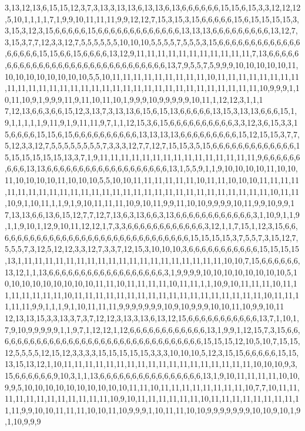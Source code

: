 3,13,12,13,6,15,15,12,3,7,3,13,3,13,13,6,13,13,6,13,6,6,6,6,6,6,15,15,6,15,3,3,12,12,12,5,10,1,1,1,1,7,1,9,9,10,11,11,11,9,9,12,12,7,15,3,15,3,15,6,6,6,6,6,15,6,15,15,15,15,3,3,15,3,12,3,15,6,6,6,6,6,15,6,6,6,6,6,6,6,6,6,6,6,6,6,13,13,13,6,6,6,6,6,6,6,6,6,13,12,7,3,15,3,7,7,12,3,3,12,7,5,5,5,5,5,5,10,10,10,5,5,5,5,7,5,5,5,3,15,6,6,6,6,6,6,6,6,6,6,6,6,6,6,6,6,6,6,15,15,6,6,15,6,6,6,6,13,12,9,11,11,11,11,11,11,11,11,11,11,11,7,13,6,6,6,6,6,6,6,6,6,6,6,6,6,6,6,6,6,6,6,6,6,6,6,6,6,6,6,6,6,6,13,7,9,5,5,7,5,9,9,9,10,10,10,10,10,11,10,10,10,10,10,10,10,10,5,5,10,11,11,11,11,11,11,11,11,11,10,11,11,11,11,11,11,11,11,11,11,11,11,11,11,11,11,11,11,11,11,11,11,11,11,11,11,11,11,11,11,11,11,10,9,9,9,1,10,11,10,9,1,9,9,9,11,9,11,10,11,10,1,9,9,9,10,9,9,9,9,9,10,11,1,12,12,3,1,1,1
7,12,13,6,6,3,6,6,15,12,3,13,7,3,13,13,6,15,6,15,13,6,6,6,6,6,13,15,3,13,13,6,6,6,15,1,9,1,1,1,1,1,9,11,9,1,9,11,11,9,7,1,1,12,15,3,6,15,6,6,6,6,6,6,6,6,6,6,3,3,12,3,6,15,3,3,15,6,6,6,6,15,15,6,15,6,6,6,6,6,6,6,6,6,6,13,13,13,13,6,6,6,6,6,6,6,6,6,15,12,15,15,3,7,7,5,12,3,3,12,7,5,5,5,5,5,5,5,5,7,3,3,3,12,7,7,12,7,15,15,3,5,15,6,6,6,6,6,6,6,6,6,6,6,6,6,15,15,15,15,15,15,13,3,7,1,9,11,11,11,11,11,11,11,11,11,11,11,11,11,11,11,9,6,6,6,6,6,6,6,6,6,13,13,6,6,6,6,6,6,6,6,6,6,6,6,6,6,6,6,6,6,6,13,1,5,5,9,1,1,9,10,10,10,10,11,10,10,11,10,10,10,10,11,10,10,10,5,5,10,10,11,11,11,11,11,11,10,11,11,10,10,10,11,11,11,11,11,11,11,11,11,11,11,11,11,11,11,11,11,11,11,11,11,11,11,11,11,11,11,11,11,10,11,11,10,9,1,10,11,1,1,9,1,9,10,11,11,11,10,9,10,11,9,9,11,10,10,9,9,9,9,10,11,9,9,10,9,9,1
7,13,13,6,6,13,6,15,12,7,7,12,7,13,6,3,13,6,6,3,13,6,6,6,6,6,6,6,6,6,6,6,6,3,1,10,9,1,1,9,1,1,9,10,1,12,9,10,11,12,12,1,7,3,3,6,6,6,6,6,6,6,6,6,6,6,6,3,12,1,1,7,15,1,12,3,15,6,6,6,6,6,6,6,6,6,6,6,6,6,6,6,6,6,6,6,6,6,6,6,6,6,6,6,6,6,6,6,15,15,15,15,3,7,5,5,7,3,15,12,7,5,5,5,7,3,12,5,12,12,3,3,12,7,3,3,7,12,15,3,10,10,10,3,6,6,6,6,6,6,6,6,6,6,6,15,15,15,15,13,1,11,11,11,11,11,11,11,11,11,11,11,11,11,11,11,11,11,11,11,10,10,7,15,6,6,6,6,6,6,13,12,1,1,13,6,6,6,6,6,6,6,6,6,6,6,6,6,6,6,6,6,6,3,1,9,9,9,9,10,10,10,10,10,10,10,10,5,10,10,10,10,10,10,10,10,10,11,11,10,11,11,11,11,10,11,11,1,1,10,9,10,11,11,11,10,11,11,11,11,11,11,11,10,11,11,11,11,11,11,11,11,11,11,11,11,11,11,11,11,11,11,10,11,11,11,11,11,9,9,1,1,1,9,1,10,11,11,11,9,9,9,9,9,9,9,10,9,10,9,9,9,10,10,11,10,9,9,10,11
12,13,13,15,3,3,13,3,7,3,7,12,12,3,13,3,13,6,13,12,15,6,6,6,6,6,6,6,6,6,6,6,13,7,1,10,1,7,9,10,9,9,9,9,9,1,1,9,7,1,12,12,1,12,6,6,6,6,6,6,6,6,6,6,6,6,13,1,9,9,1,12,15,7,3,15,6,6,6,6,6,6,6,6,6,6,6,6,6,6,6,6,6,6,6,6,6,6,6,6,6,6,6,6,6,6,6,6,6,15,15,15,12,10,5,10,7,15,15,12,5,5,5,5,12,15,12,3,3,3,3,15,15,15,15,15,3,3,3,10,10,10,5,12,3,15,15,6,6,6,6,6,15,15,13,15,13,12,1,10,11,11,11,11,11,11,11,11,11,11,11,11,11,11,11,11,11,11,10,10,10,9,3,15,6,6,6,6,6,6,9,10,3,1,1,13,6,6,6,6,6,6,6,6,6,6,6,6,6,6,6,6,13,1,9,10,11,11,11,11,10,10,9,9,5,10,10,10,10,10,10,10,10,10,10,11,11,10,11,11,11,11,11,11,11,11,10,7,7,10,11,11,11,11,11,11,11,11,11,11,11,11,10,9,10,11,11,11,11,11,11,10,11,11,11,11,11,11,11,11,11,11,9,9,10,10,11,11,11,10,10,11,10,9,9,9,1,10,11,11,10,10,9,9,9,9,9,9,9,10,10,9,10,1,9,1,10,9,9,9
